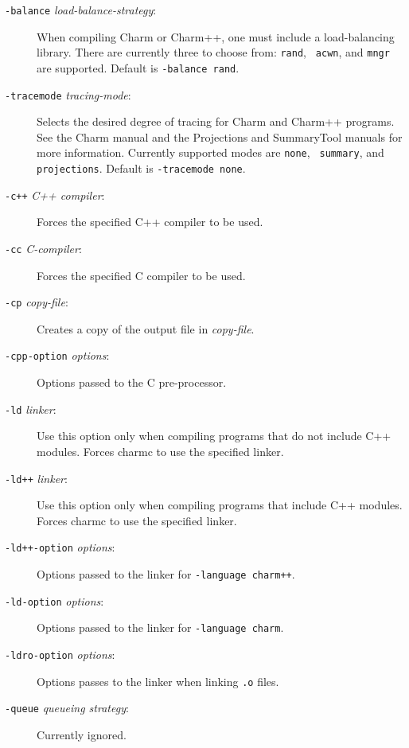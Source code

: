 \begin{description}
\item[{\tt -balance} {\em load-balance-strategy}:]

When compiling Charm or Charm++, one must include a load-balancing
library.  There are currently three to choose from: {\tt rand}, {\tt
acwn}, and {\tt mngr} are supported.  Default is {\tt -balance rand}.

\item[{\tt -tracemode} {\em tracing-mode}:]

Selects the desired degree of tracing for Charm and Charm++ programs.
See the Charm manual and the Projections and SummaryTool manuals for
more information.  Currently supported modes are {\tt none}, {\tt
summary}, and {\tt projections}. Default is {\tt -tracemode none}.


\item[{\tt -c++} {\em C++ compiler}:]

Forces the specified C++ compiler to be used.

\item[{\tt -cc} {\em C-compiler}:]

Forces the specified C compiler to be used.

\item[{\tt -cp} {\em copy-file}:]

Creates a copy of the output file in {\em copy-file}.

\item[{\tt -cpp-option} {\em options}:]

Options passed to the C pre-processor.

\item[{\tt -ld} {\em linker}:]

Use this option only when compiling programs that do not include C++
modules.  Forces charmc to use the specified linker.

\item[{\tt -ld++} {\em linker}:]

Use this option only when compiling programs that include C++
modules.  Forces charmc to use the specified linker.

\item[{\tt -ld++-option} {\em options}:]

Options passed to the linker for {\tt -language charm++}.

\item[{\tt -ld-option} {\em options}:]

Options passed to the linker for {\tt -language charm}.

\item[{\tt -ldro-option} {\em options}:]

Options passes to the linker when linking {\tt .o} files.

\item[{\tt -queue} {\em queueing strategy}:]

Currently ignored.

\end{description}
